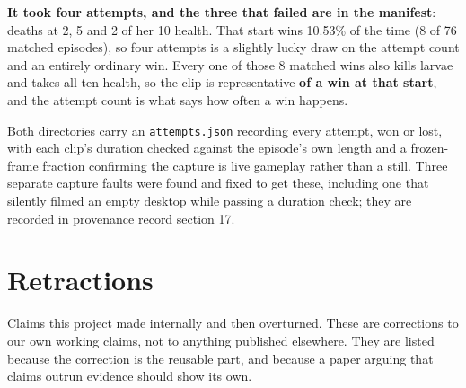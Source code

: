 \documentclass[11pt]{article}
\begin{document}
\textbf{It took four attempts, and the three that failed are in the manifest}: deaths at 2, 5 and 2 of her 10 health. That start wins 10.53\% of the time (8 of 76 matched episodes), so four attempts is a slightly lucky draw on the attempt count and an entirely ordinary win. Every one of those 8 matched wins also kills larvae and takes all ten health, so the clip is representative \textbf{of a win at that start}, and the attempt count is what says how often a win happens.

Both directories carry an \texttt{attempts.json} recording every attempt, won or lost, with each clip's duration checked against the episode's own length and a frozen-frame fraction confirming the capture is live gameplay rather than a still. Three separate capture faults were found and fixed to get these, including one that silently filmed an empty desktop while passing a duration check; they are recorded in \href{https://github.com/JordyKieto/ppo-hyrule/blob/main/PROVENANCE.md}{provenance record} section 17.

\section{Retractions}
\label{sec:12}

Claims this project made internally and then overturned. These are corrections to our own working claims, not to anything published elsewhere. They are listed because the correction is the reusable part, and because a paper arguing that claims outrun evidence should show its own.
\end{document}
